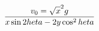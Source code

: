 \documentclass[preview]{standalone}
\begin{document}
\begin{align*}
{\displaystyle v_{0}={\sqrt  x^{2}g} \over {x\sin 2	heta -2y\cos ^{2}	heta  }}
\end{align*}
\end{document}
